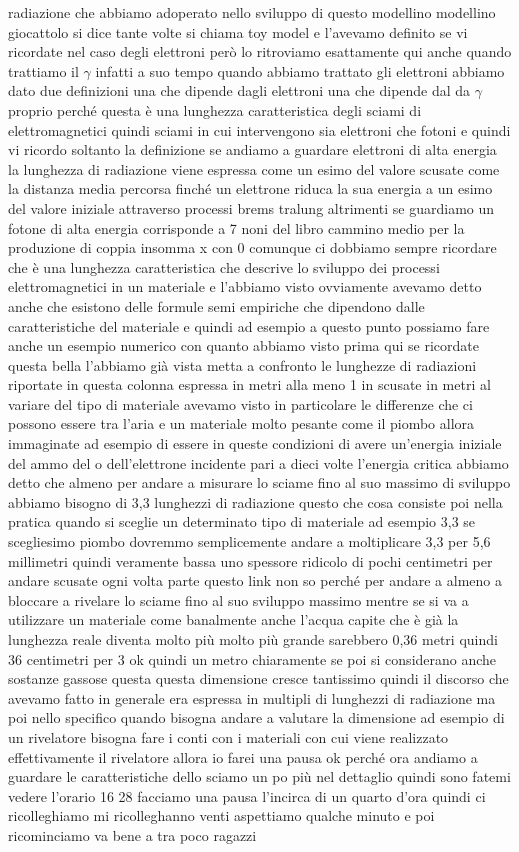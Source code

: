{radiazione che abbiamo adoperato nello sviluppo di questo modellino modellino giocattolo si dice tante volte si chiama toy model e l'avevamo definito se vi ricordate nel caso degli elettroni però lo ritroviamo esattamente qui anche quando trattiamo il $\gamma$ infatti a suo tempo quando abbiamo trattato gli elettroni abbiamo dato due definizioni una che dipende dagli elettroni una che dipende dal da $\gamma$ proprio perché questa è una lunghezza caratteristica degli sciami di elettromagnetici quindi sciami in cui intervengono sia elettroni che fotoni e quindi vi ricordo soltanto la definizione se andiamo a guardare elettroni di alta energia la lunghezza di radiazione viene espressa come un esimo del valore scusate come la distanza media percorsa finché un elettrone riduca la sua energia a un esimo del valore iniziale attraverso processi brems tralung altrimenti se guardiamo un fotone di alta energia corrisponde a 7 noni del libro cammino medio per la produzione di coppia insomma x con 0 comunque ci dobbiamo sempre ricordare che è una lunghezza caratteristica che descrive lo sviluppo dei processi elettromagnetici in un materiale e l'abbiamo visto ovviamente avevamo detto anche che esistono delle formule semi empiriche che dipendono dalle caratteristiche del materiale e quindi ad esempio a questo punto possiamo fare anche un esempio numerico con quanto abbiamo visto prima qui se ricordate questa bella l'abbiamo già vista metta a confronto le lunghezze di radiazioni riportate in questa colonna espressa in metri alla meno 1 in scusate in metri al variare del tipo di materiale avevamo visto in particolare le differenze che ci possono essere tra l'aria e un materiale molto pesante come il piombo allora immaginate ad esempio di essere in queste condizioni di avere un'energia iniziale del ammo del o dell'elettrone incidente pari a dieci volte l'energia critica abbiamo detto che almeno per andare a misurare lo sciame fino al suo massimo di sviluppo abbiamo bisogno di 3,3 lunghezzi di radiazione questo che cosa consiste poi nella pratica quando si sceglie un determinato tipo di materiale ad esempio 3,3 se scegliesimo piombo dovremmo semplicemente andare a moltiplicare 3,3 per 5,6 millimetri quindi veramente bassa uno spessore ridicolo di pochi centimetri per andare scusate ogni volta parte questo link non so perché per andare a almeno a bloccare a rivelare lo sciame fino al suo sviluppo massimo mentre se si va a utilizzare un materiale come banalmente anche l'acqua capite che è già la lunghezza reale diventa molto più molto più grande sarebbero 0,36 metri quindi 36 centimetri per 3 ok quindi un metro chiaramente se poi si considerano anche sostanze gassose questa questa dimensione cresce tantissimo quindi il discorso che avevamo fatto in generale era espressa in multipli di lunghezzi di radiazione ma poi nello specifico quando bisogna andare a valutare la dimensione ad esempio di un rivelatore bisogna fare i conti con i materiali con cui viene realizzato effettivamente il rivelatore allora io farei una pausa ok perché ora andiamo a guardare le caratteristiche dello sciamo un po più nel dettaglio quindi sono fatemi vedere l'orario 16 28 facciamo una pausa l'incirca di un quarto d'ora quindi ci ricolleghiamo mi ricolleghanno venti aspettiamo qualche minuto e poi ricominciamo va bene a tra poco ragazzi


}
